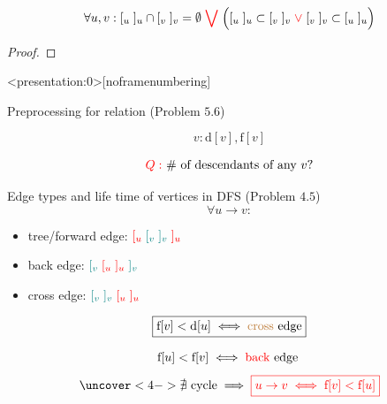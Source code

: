 \begin{frame}{}
  \begin{theorem}
    \[
	  \forall u,v: [_{u} \; ]_{u} \cap [_{v} \; ]_{v} = \emptyset \;\textcolor{red}{\bigvee}\;
	  \Big([_{u} \; ]_{u} \subset [_{v} \; ]_{v} \;\textcolor{red}{\lor}\; [_{v} \; ]_{v} \subset [_{u} \; ]_{u}\Big)
    \]
  \end{theorem}

  \pause
  \begin{proof}
  \end{proof}
\end{frame}
\begin{frame}<presentation:0>[noframenumbering]
  \begin{exampleblock}{Preprocessing for  relation (Problem $5.6$)}

    \centerline{}
  \end{exampleblock}

  \pause
  \[
    v: \text{d}[v], \text{f}[v]
  \]

  \pause
  \vspace{-0.20cm}
  \[
    \textcolor{red}{Q: } \text{ \# of descendants of any } v?
  \]
\end{frame}

\begin{frame}{}
  \begin{exampleblock}{Edge types and life time of vertices in DFS (Problem $4.5$)}
    \[
      \forall u \to v:
    \]
    \vspace{-0.30cm}
    \begin{itemize}
      \setlength{\itemsep}{5pt}
      \item tree/forward edge: $\textcolor{red}{[_{u}}\; \textcolor{teal}{[_{v}\; ]_{v}}\; \textcolor{red}{]_{u}}$
      \item back edge: $\textcolor{teal}{[_{v}}\; \textcolor{red}{[_{u}\; ]_{u}}\; \textcolor{teal}{]_{v}}$
      \item cross edge: $\textcolor{teal}{[_{v}\; ]_{v}}\; \textcolor{red}{[_{u}\; ]_{u}}$
    \end{itemize}
  \end{exampleblock}

  \pause
  \[
	\boxed{\text{f}[v] < \text{d}[u] \iff \text{\textcolor{brown}{cross} edge}}
  \]

  \pause
  \[
    \text{f}[u] < \text{f}[v] \iff \text{\textcolor{red}{back} edge }
  \]
  \[
    \uncover<4->{\nexists \text{ cycle} \implies \red{\boxed{u \to v \iff \text{f}[v] < \text{f}[u]}}}
  \]
\end{frame}


